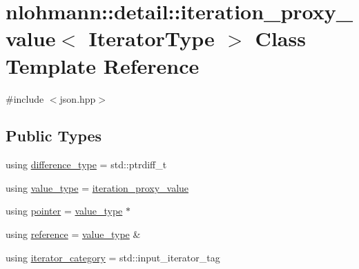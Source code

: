 \hypertarget{classnlohmann_1_1detail_1_1iteration__proxy__value}{}\section{nlohmann\+::detail\+::iteration\+\_\+proxy\+\_\+value$<$ Iterator\+Type $>$ Class Template Reference}
\label{classnlohmann_1_1detail_1_1iteration__proxy__value}


{\ttfamily \#include $<$json.\+hpp$>$}

\subsection*{Public Types}
\begin{DoxyCompactItemize}
\item 
using \mbox{\hyperlink{classnlohmann_1_1detail_1_1iteration__proxy__value_ada6b4e6d55d8ed7ac79e49a03e9d1fe2}{difference\+\_\+type}} = std\+::ptrdiff\+\_\+t
\item 
using \mbox{\hyperlink{classnlohmann_1_1detail_1_1iteration__proxy__value_a5e90a5810cc1bb6c1000eabbfdfe7b9e}{value\+\_\+type}} = \mbox{\hyperlink{classnlohmann_1_1detail_1_1iteration__proxy__value}{iteration\+\_\+proxy\+\_\+value}}
\item 
using \mbox{\hyperlink{classnlohmann_1_1detail_1_1iteration__proxy__value_a44c64feee85b8e7164a05310e6418a4b}{pointer}} = \mbox{\hyperlink{classnlohmann_1_1detail_1_1iteration__proxy__value_a5e90a5810cc1bb6c1000eabbfdfe7b9e}{value\+\_\+type}} $\ast$
\item 
using \mbox{\hyperlink{classnlohmann_1_1detail_1_1iteration__proxy__value_a5bc7d3133daab5ec4797f3132e093af8}{reference}} = \mbox{\hyperlink{classnlohmann_1_1detail_1_1iteration__proxy__value_a5e90a5810cc1bb6c1000eabbfdfe7b9e}{value\+\_\+type}} \&
\item 
using \mbox{\hyperlink{classnlohmann_1_1detail_1_1iteration__proxy__value_a1ab8c44e3772c03651b5ad07216043cf}{iterator\+\_\+category}} = std\+::input\+\_\+iterator\+\_\+tag
\end{DoxyCompactItemize}

